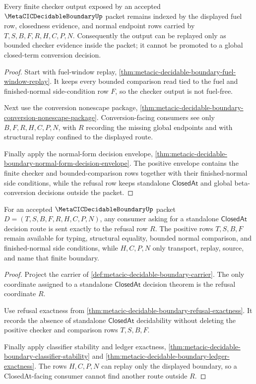\begin{theorem}
\label{thm:metacic-decidable-boundary-finite-checker-indexing}
Every finite checker output exposed by an accepted $\MetaCICDecidableBoundaryUp$ packet remains indexed by the displayed fuel row, closedness evidence, and normal endpoint rows carried by $T,S,B,F,R,H,C,P,N$. Consequently the output can be replayed only as bounded checker evidence inside the packet; it cannot be promoted to a global closed-term conversion decision.
\end{theorem}
\begin{proof}
Start with fuel-window replay, \autoref{thm:metacic-decidable-boundary-fuel-window-replay}. It keeps every bounded comparison read tied to the fuel and finished-normal side-condition row $F$, so the checker output is not fuel-free.

Next use the conversion nonescape package, \autoref{thm:metacic-decidable-boundary-conversion-nonescape-package}. Conversion-facing consumers see only $B,F,R,H,C,P,N$, with $R$ recording the missing global endpoints and with structural replay confined to the displayed route.

Finally apply the normal-form decision envelope, \autoref{thm:metacic-decidable-boundary-normal-form-decision-envelope}. The positive envelope contains the finite checker and bounded-comparison rows together with their finished-normal side conditions, while the refusal row keeps standalone $\mathsf{ClosedAt}$ and global beta-conversion decisions outside the packet.
\end{proof}

\begin{theorem}
\label{thm:metacic-decidable-boundary-closedat-refusal-route}
For an accepted $\MetaCICDecidableBoundaryUp$ packet $D=(T,S,B,F,R,H,C,P,N)$, any consumer asking for a standalone $\mathsf{ClosedAt}$ decision route is sent exactly to the refusal row $R$. The positive rows $T,S,B,F$ remain available for typing, structural equality, bounded normal comparison, and finished-normal side conditions, while $H,C,P,N$ only transport, replay, source, and name that finite boundary.
\end{theorem}
\begin{proof}
Project the carrier of \autoref{def:metacic-decidable-boundary-carrier}. The only coordinate assigned to a standalone $\mathsf{ClosedAt}$ decision theorem is the refusal coordinate $R$.

Use refusal exactness from \autoref{thm:metacic-decidable-boundary-refusal-exactness}. It records the absence of standalone $\mathsf{ClosedAt}$ decidability without deleting the positive checker and comparison rows $T,S,B,F$.

Finally apply classifier stability and ledger exactness, \autoref{thm:metacic-decidable-boundary-classifier-stability} and \autoref{thm:metacic-decidable-boundary-ledger-exactness}. The rows $H,C,P,N$ can replay only the displayed boundary, so a ClosedAt-facing consumer cannot find another route outside $R$.
\end{proof}

